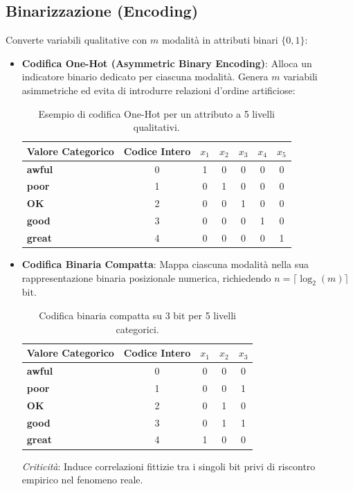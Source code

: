 \subsection{Binarizzazione (Encoding)}

Converte variabili qualitative con $m$ modalità in attributi binari $\{0, 1\}$:

\begin{itemize}
    \item \textbf{Codifica One-Hot (Asymmetric Binary Encoding)}: Alloca un indicatore binario dedicato per ciascuna modalità. Genera $m$ variabili asimmetriche ed evita di introdurre relazioni d'ordine artificiose:
    \begin{table}[htbp]
        \centering
        \small
        \begin{tabular}{lcccccc}
            \toprule
            \textbf{Valore Categorico} & \textbf{Codice Intero} & $x_1$ & $x_2$ & $x_3$ & $x_4$ & $x_5$ \\
            \midrule
            \textbf{awful} & 0 & 1 & 0 & 0 & 0 & 0 \\
            \textbf{poor}  & 1 & 0 & 1 & 0 & 0 & 0 \\
            \textbf{OK}    & 2 & 0 & 0 & 1 & 0 & 0 \\
            \textbf{good}  & 3 & 0 & 0 & 0 & 1 & 0 \\
            \textbf{great} & 4 & 0 & 0 & 0 & 0 & 1 \\
            \bottomrule
        \end{tabular}
        \caption{Esempio di codifica One-Hot per un attributo a 5 livelli qualitativi.}
        \label{tab:dm-one-hot}
    \end{table}

    \item \textbf{Codifica Binaria Compatta}: Mappa ciascuna modalità nella sua rappresentazione binaria posizionale numerica, richiedendo $n = \lceil \log_2(m) \rceil$ bit.
    \begin{table}[htbp]
        \centering
        \small
        \begin{tabular}{lcccc}
            \toprule
            \textbf{Valore Categorico} & \textbf{Codice Intero} & $x_1$ & $x_2$ & $x_3$ \\
            \midrule
            \textbf{awful} & 0 & 0 & 0 & 0 \\
            \textbf{poor}  & 1 & 0 & 0 & 1 \\
            \textbf{OK}    & 2 & 0 & 1 & 0 \\
            \textbf{good}  & 3 & 0 & 1 & 1 \\
            \textbf{great} & 4 & 1 & 0 & 0 \\
            \bottomrule
        \end{tabular}
        \caption{Codifica binaria compatta su 3 bit per 5 livelli categorici.}
        \label{tab:dm-compact-binary}
    \end{table}
    \textit{Criticità}: Induce correlazioni fittizie tra i singoli bit privi di riscontro empirico nel fenomeno reale.
\end{itemize}

